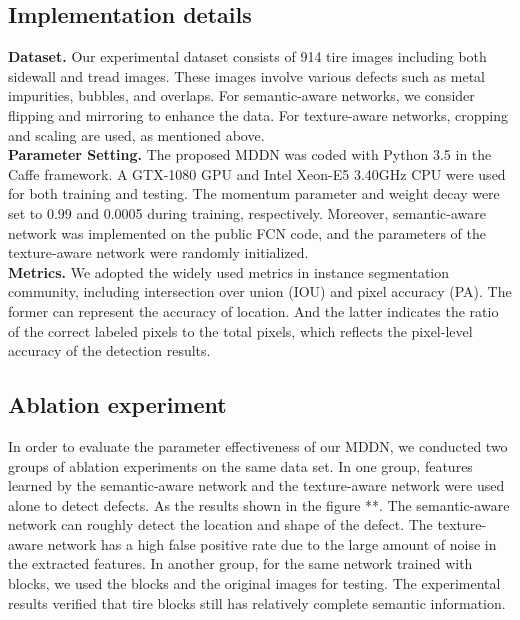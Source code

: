 \documentclass{article}
\begin{document}
\subsection{Implementation details}
\label{Implementation details}
{\bf Dataset.} Our experimental dataset consists of 914 tire images including both sidewall and tread images. These images involve various defects such as metal impurities, bubbles, and overlaps. For semantic-aware networks, we consider flipping and mirroring to enhance the data. For texture-aware networks, cropping and scaling are used, as mentioned above.\\
{\bf Parameter Setting.} The proposed MDDN was coded with Python 3.5 in the Caffe framework. A GTX-1080 GPU and Intel Xeon-E5 3.40GHz CPU were used for both training and testing. The momentum parameter and weight decay were set to 0.99 and 0.0005 during training, respectively. Moreover, semantic-aware network was implemented on the public FCN code, and the parameters of the texture-aware network were randomly initialized. \\
{\bf Metrics.} We adopted the widely used metrics in instance segmentation community, including intersection over union (IOU) and pixel accuracy (PA). The former can represent the accuracy of location. And the latter indicates the ratio of the correct labeled pixels to the total pixels, which reflects the pixel-level accuracy of the detection results.



\subsection{Ablation experiment}
\label{Ablation experiment}
In order to evaluate the parameter effectiveness of our MDDN, we conducted two groups of ablation experiments on the same data set. In one group, features learned by the semantic-aware network and the texture-aware network were used alone to detect defects. As the results shown in the figure **. The semantic-aware network can roughly detect the location and shape of the defect. The texture-aware network has a high false positive rate due to the large amount of noise in the extracted features. In another group, for the same network trained with blocks, we used the blocks and the original images for testing. The experimental results verified that tire blocks still has relatively complete semantic information.
\end{document}
